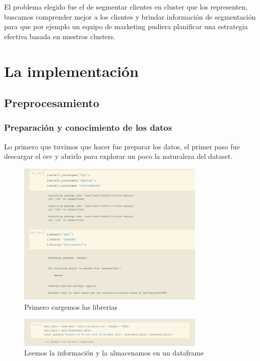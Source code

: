 \documentclass[12pt, fleqn]{report}                             %
\theoremstyle{break}                                            %
\begin{document}
        El problema elegido fue el de segmentar clientes en cluster que los representen, buscamos comprender mejor a los
        clientes y brindar información de segmentación para que por ejemplo un equipo de marketing pudiera planificar
        una estrategia efectiva basada en nuestros clusters.

    \chapter{La implementación}

        \section{Preprocesamiento}

            \subsection{Preparación y conocimiento de los datos}

                Lo primero que tuvimos que hacer fue preparar los datos, el primer paso fue descargar el csv y
                abrirlo para explorar un poco
                la naturaleza del dataset.

                \begin{figure}[ht!]
                    \centering
                    \includegraphics[width=0.8\textwidth]{1}
                    \caption{Primero cargemos las librerias}
                \end{figure}

                \begin{figure}[ht!]
                    \centering
                    \includegraphics[width=0.8\textwidth]{2}
                    \caption{Leemos la información y la almacenamos en un dataframe}
                \end{figure}
\end{document}

